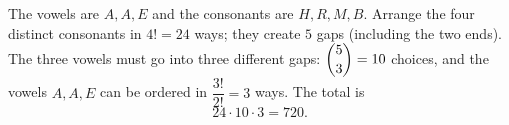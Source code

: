 The vowels are $A,A,E$ and the consonants are $H,R,M,B$. Arrange the four distinct consonants in $4!=24$ ways; they create $5$ gaps (including the two ends). The three vowels must go into three different gaps: $\dbinom53=10$ choices, and the vowels $A,A,E$ can be ordered in $\dfrac{3!}{2!}=3$ ways. The total is
\[
24\cdot10\cdot3=\boxed{720}.
\]

